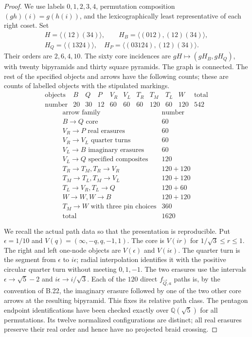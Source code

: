 \begin{proof}
We use labels $0,1,2,3,4$, permutation composition
$(gh)(i)=g(h(i))$, and the lexicographically least representative
of each right coset.  Set
\[
 \begin{gathered}
 H=\langle(12)(34)\rangle,\qquad
 H_B=\langle(012),(12)(34)\rangle,\\
 H_Q=\langle(1324)\rangle,
 \quad H_P=\langle(03124),(12)(34)\rangle.
 \end{gathered}
\]
Their orders are $2,6,4,10$.  The sixty core incidences are
$gH\mapsto(gH_B,gH_Q)$, with twenty bipyramids and thirty square
pyramids.  The graph is connected.  The rest of the specified objects
and arrows have the following counts; these are counts of labelled
objects with the stipulated markings.
\[
\begin{array}{c|rrrrrrrrr|r}
\text{objects}&B&Q&P&V_R&V_L&T_R&T_M&T_L&W&\text{total}\\ \hline
\text{number}&20&30&12&60&60&60&120&60&120&542
\end{array}
\]
\[
\begin{array}{l|r}
\text{arrow family}&\text{number}\\ \hline
 B\longrightarrow Q\text{ core}&60\\
 V_R\longrightarrow P\text{ real erasures}&60\\
 V_R\longrightarrow V_L\text{ quarter turns}&60\\
 V_L\longrightarrow B\text{ imaginary erasures}&60\\
 V_L\longrightarrow Q\text{ specified composites}&120\\
 T_R\longrightarrow T_M, T_R\longrightarrow V_R&120+120\\
 T_M\longrightarrow T_L, T_M\longrightarrow V_L&120+120\\
 T_L\longrightarrow V_R, T_L\longrightarrow Q&120+60\\
 W\longrightarrow W, W\longrightarrow B&120+120\\
 T_M\longrightarrow W\text{ with three pin choices}&360\\ \hline
 \text{total}&1620
\end{array}                                                     \tag{B5.1}
\]

We recall the actual path data so that the presentation is reproducible.
Put $\epsilon=1/10$ and
$V(q)=(\infty,-q,q,-1,1)$.  The core is
$V(ir)$ for $1/\sqrt3\leq r\leq1$.  The right and left one-node
objects are $V(\epsilon)$ and $V(i\epsilon)$.
The quarter turn is the segment from $\epsilon$ to $i\epsilon$;
radial interpolation identifies it with the positive circular quarter
turn without meeting $0,1,-1$.  The two erasures use the intervals
$\epsilon\to\sqrt5-2$ and $i\epsilon\to i/\sqrt3$.
Each of the $120$ direct $f_{\vec Q,a}$ paths is, by the convention of
B.22, the imaginary erasure followed by one of the two other core
arrows at the resulting bipyramid.  This fixes its relative path class.
The pentagon endpoint identifications have been checked exactly over
$\mathbb Q(\sqrt5)$ for all permutations.  Its twelve normalized
configurations are distinct; all real erasures preserve their real
order and hence have no projected braid crossing.


\end{proof}
